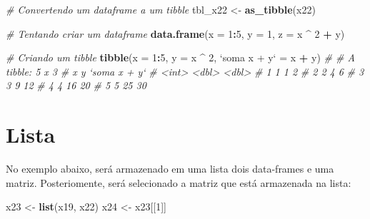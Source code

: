 \documentclass[
]{book}
\newenvironment{Shaded}{\begin{snugshade}}{\end{snugshade}}
\newcommand{\CommentTok}[1]{\textcolor[rgb]{0.56,0.35,0.01}{\textit{#1}}}
\newcommand{\DataTypeTok}[1]{\textcolor[rgb]{0.13,0.29,0.53}{#1}}
\newcommand{\DecValTok}[1]{\textcolor[rgb]{0.00,0.00,0.81}{#1}}
\newcommand{\KeywordTok}[1]{\textcolor[rgb]{0.13,0.29,0.53}{\textbf{#1}}}
\newcommand{\NormalTok}[1]{#1}
\newcommand{\OperatorTok}[1]{\textcolor[rgb]{0.81,0.36,0.00}{\textbf{#1}}}
\newcommand{\StringTok}[1]{\textcolor[rgb]{0.31,0.60,0.02}{#1}}
\begin{document}
\begin{Shaded}
\begin{Highlighting}[]
\CommentTok{# Convertendo um dataframe a um tibble}
\NormalTok{tbl_x22 <-}\StringTok{ }\KeywordTok{as_tibble}\NormalTok{(x22)}
\end{Highlighting}
\end{Shaded}

\begin{Shaded}
\begin{Highlighting}[]
\CommentTok{# Tentando criar um dataframe}
\KeywordTok{data.frame}\NormalTok{(}\DataTypeTok{x =} \DecValTok{1}\OperatorTok{:}\DecValTok{5}\NormalTok{,}
           \DataTypeTok{y =} \DecValTok{1}\NormalTok{,}
           \DataTypeTok{z =}\NormalTok{ x }\OperatorTok{^}\StringTok{ }\DecValTok{2} \OperatorTok{+}\StringTok{ }\NormalTok{y)}
\end{Highlighting}
\end{Shaded}

\begin{Shaded}
\begin{Highlighting}[]
\CommentTok{# Criando um tibble}
\KeywordTok{tibble}\NormalTok{(}\DataTypeTok{x =} \DecValTok{1}\OperatorTok{:}\DecValTok{5}\NormalTok{,}
       \DataTypeTok{y =}\NormalTok{ x }\OperatorTok{^}\StringTok{ }\DecValTok{2}\NormalTok{,}
       \StringTok{`}\DataTypeTok{soma x + y}\StringTok{`}\NormalTok{ =}\StringTok{ }\NormalTok{x }\OperatorTok{+}\StringTok{ }\NormalTok{y)}
\CommentTok{# # A tibble: 5 x 3}
\CommentTok{#       x     y `soma x + y`}
\CommentTok{#   <int> <dbl>        <dbl>}
\CommentTok{# 1     1     1            2}
\CommentTok{# 2     2     4            6}
\CommentTok{# 3     3     9           12}
\CommentTok{# 4     4    16           20}
\CommentTok{# 5     5    25           30}
\end{Highlighting}
\end{Shaded}

\hypertarget{lista}{%
\section{Lista}\label{lista}}

No exemplo abaixo, será armazenado em uma lista  dois data-frames e uma matriz. Posteriomente, será selecionado a matriz que está armazenada na lista:

\begin{Shaded}
\begin{Highlighting}[]
\NormalTok{x23 <-}\StringTok{ }\KeywordTok{list}\NormalTok{(x19, x22)}
\NormalTok{x24 <-}\StringTok{ }\NormalTok{x23[[}\DecValTok{1}\NormalTok{]]}
\end{Highlighting}
\end{Shaded}
\end{document}
